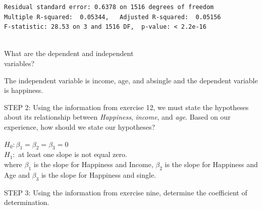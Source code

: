 \documentclass[11pt, chapterprefix=true]{scrbook}\usepackage[]{graphicx}\usepackage[]{color}
\begin{document}
\begin{exercises}
\begin{exercise}
{{\begin{verbatim}
Residual standard error: 0.6378 on 1516 degrees of freedom
Multiple R-squared:  0.05344,	Adjusted R-squared:  0.05156 
F-statistic: 28.53 on 3 and 1516 DF,  p-value: < 2.2e-16


  \end{verbatim}
}}

What are the dependent and independent \\ variables?

    \vspace{5mm}

    \end{exercise}
    \vspace{2mm}
    \begin{solution}
       The independent variable is income,   age, and absingle and the dependent variable is happiness.
    \end{solution}

  \begin{exercise} %

    STEP 2: Using the information from exercise 12, we must state the hypotheses about its relationship between {\textit{Happiness}}, {\textit{income}}, and {\textit{age}}.  Based on our experience, how should we state our hypotheses?

    \vspace{5mm}

    \end{exercise}
    \vspace{2mm}
    \begin{solution}

       $H_0: \beta_1 = \beta_2 = \beta_3 = 0$ \\
       $H_1:$ at least one slope is not equal zero. \\
       where $\beta_1$ is the slope for Happiness and Income,  $\beta_2$ is the slope for Happiness and Age and $\beta_3$ is         the slope for Happiness and single.

    \end{solution}

  \begin{exercise} %

    STEP 3: Using the information from exercise nine, determine the coefficient of determination.

    \vspace{5mm}

    \end{exercise}
    \vspace{2mm}
    \begin{solution}


\end{solution}
\end{exercises}
\end{document}
